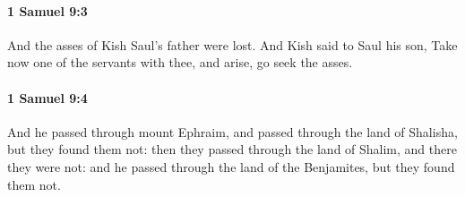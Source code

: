 		\paragraph{1 Samuel 9:3} %
			\label{1SAMUEL-9-3}

			And the asses of Kish Saul’s father were lost. And Kish said to Saul his son, Take now one of the servants with thee, and arise, go seek the asses.


		\paragraph{1 Samuel 9:4} %
			\label{1SAMUEL-9-4}

			And he passed through mount Ephraim, and passed through the land of Shalisha, but they found them not: then they passed through the land of Shalim, and there they were not: and he passed through the land of the Benjamites, but they found them not.

